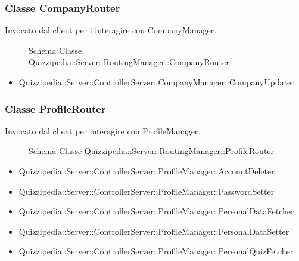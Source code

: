 \subsubsection{Classe CompanyRouter}
Invocato dal client per i interagire con CompanyManager.
\begin{figure}[H]
\centering
\noindent{}
\caption{Schema Classe Quizzipedia::Server::RoutingManager::CompanyRouter}
\end{figure}
\begin{itemize}
\item Quizzipedia::Server::ControllerServer::CompanyManager::CompanyUpdater
\end{itemize}
\subsubsection{Classe ProfileRouter}
Invocato dal client per interagire con ProfileManager.
\begin{figure}[H]
\centering
\noindent{}
\caption{Schema Classe Quizzipedia::Server::RoutingManager::ProfileRouter}
\end{figure}
\begin{itemize}
\item Quizzipedia::Server::ControllerServer::ProfileManager::AccountDeleter
\item Quizzipedia::Server::ControllerServer::ProfileManager::PasswordSetter
\item Quizzipedia::Server::ControllerServer::ProfileManager::PersonalDataFetcher
\item Quizzipedia::Server::ControllerServer::ProfileManager::PersonalDataSetter
\item Quizzipedia::Server::ControllerServer::ProfileManager::PersonalQuizFetcher
\end{itemize}
